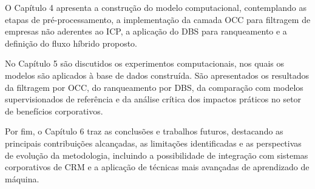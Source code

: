 O Capítulo 4 apresenta a construção do modelo computacional, contemplando as etapas de pré-processamento, a implementação da camada OCC para filtragem de empresas não aderentes ao ICP, a aplicação do DBS para ranqueamento e a definição do fluxo híbrido proposto.  

No Capítulo 5 são discutidos os experimentos computacionais, nos quais os modelos são aplicados à base de dados construída. São apresentados os resultados da filtragem por OCC, do ranqueamento por DBS, da comparação com modelos supervisionados de referência e da análise crítica dos impactos práticos no setor de benefícios corporativos.  

Por fim, o Capítulo 6 traz as conclusões e trabalhos futuros, destacando as principais contribuições alcançadas, as limitações identificadas e as perspectivas de evolução da metodologia, incluindo a possibilidade de integração com sistemas corporativos de CRM e a aplicação de técnicas mais avançadas de aprendizado de máquina.
